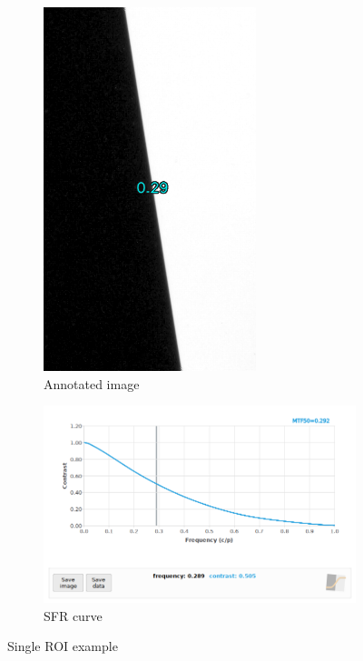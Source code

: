 \documentclass[a4paper]{article}
\begin{document}
\begin{figure}[!ht]
\begin{subfigure}[c]{0.15\textwidth}
    \includegraphics[width=\textwidth]{figures/single_roi_output}
    \caption{Annotated image}
\end{subfigure}
\quad
\begin{subfigure}[c]{0.6\textwidth}
    \includegraphics[width=\textwidth]{figures/roi_sfr_example}
    \caption{SFR curve}
\end{subfigure}
\caption{Single ROI example}
\label{fig:single_roi_mode}
\end{figure}
\end{document}

